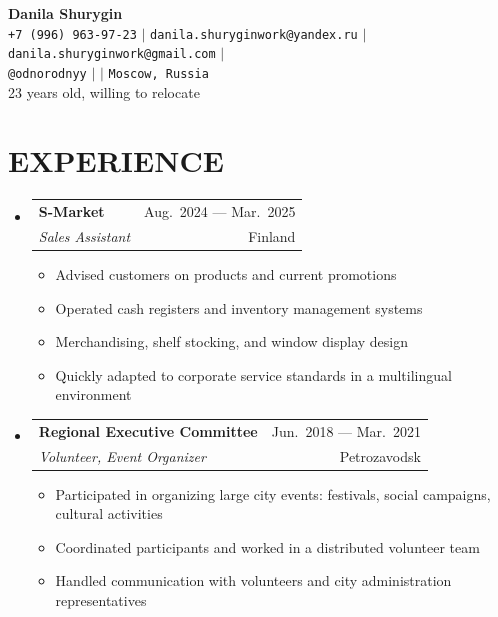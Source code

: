 \documentclass[letterpaper,11pt]{article}
\makeatletter
\newcommand{\myuline}[1]{%
  \uline{\phantom{#1}}%
  \llap{\contour{white}{#1}}%
}
\newcommand{\resumeItem}[1]{
  \item\small{
    {#1 \vspace{-1pt}}
  }
}
\newcommand{\resumeSubheading}[4]{
  \vspace{-1pt}\item
    \begin{tabular*}{\textwidth}[t]{l@{\extracolsep{\fill}}r}
      \textbf{#1} & {\color{dark-grey}\small #2}\vspace{1pt}\\
      \textit{#3} & {\color{dark-grey} \small #4}\\
    \end{tabular*}\vspace{-4pt}
}
\newcommand{\resumeSubHeadingListStart}{\begin{itemize}[leftmargin=0in, label={}]}
\newcommand{\resumeSubHeadingListEnd}{\end{itemize}}
\newcommand{\resumeItemListStart}{\begin{itemize}}
\newcommand{\resumeItemListEnd}{\end{itemize}\vspace{0pt}}
\makeatother
\begin{document}

\begin{center}
    \textbf{\Huge Danila Shurygin} \\ \vspace{5pt}
    \small
    \faPhone* \texttt{+7 (996) 963-97-23} \hspace{1pt} $|$
    \hspace{1pt} \faEnvelope \hspace{2pt} \texttt{danila.shuryginwork@yandex.ru} \hspace{1pt} $|$
    \hspace{1pt} \faEnvelope \hspace{2pt} \texttt{danila.shuryginwork@gmail.com} \hspace{1pt} $|$ 
    \\ \vspace{3pt}
    \hspace{1pt} \faTelegram \hspace{2pt} \texttt{@odnorodnyy} \hspace{1pt} $|$
    \hspace{1pt} \faGithub \hspace{2pt} \href{https://github.com/odnorodnyy}{\myuline{odnorodnyy}} \hspace{1pt} $|$
    \hspace{1pt} \faMapMarker* \hspace{2pt}\texttt{Moscow, Russia}
    \\ \vspace{5pt}
    \small 23 years old, willing to relocate
\end{center}

\section{EXPERIENCE}
  \resumeSubHeadingListStart
    \resumeSubheading
      {S-Market}{Aug.~2024 --- Mar.~2025}
      {Sales Assistant}{Finland}
      \resumeItemListStart
        \resumeItem{Advised customers on products and current promotions}
        \resumeItem{Operated cash registers and inventory management systems}
        \resumeItem{Merchandising, shelf stocking, and window display design}
        \resumeItem{Quickly adapted to corporate service standards in a multilingual environment}
      \resumeItemListEnd
    \resumeSubheading
      {Regional Executive Committee}{Jun.~2018 --- Mar.~2021}
      {Volunteer, Event Organizer}{Petrozavodsk}
      \resumeItemListStart
        \resumeItem{Participated in organizing large city events: festivals, social campaigns, cultural activities}
        \resumeItem{Coordinated participants and worked in a distributed volunteer team}
        \resumeItem{Handled communication with volunteers and city administration representatives}
      \resumeItemListEnd
  \resumeSubHeadingListEnd
\end{document}
